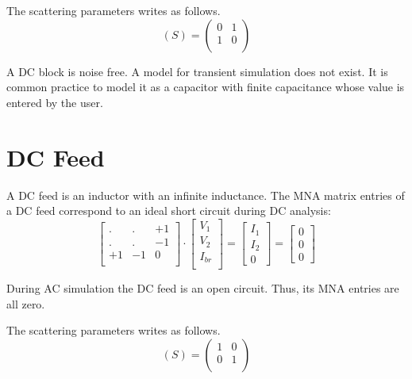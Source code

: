 The scattering parameters writes as follows.
\begin{equation}
(S) =
\begin{pmatrix}
0 & 1\\
1 & 0\\
\end{pmatrix}
\end{equation}

A DC block is noise free. A model for transient simulation does not
exist. It is common practice to model it as a capacitor with finite
capacitance whose value is entered by the user.


\section{DC Feed}

A DC feed is an inductor with an infinite inductance. The MNA
matrix entries of a DC feed correspond to an ideal short
circuit during DC analysis:
\begin{equation}
\begin{bmatrix}
. & . & +1\\
. & . & -1\\
+1 & -1 & 0\\
\end{bmatrix}
\cdot
\begin{bmatrix}
V_1\\
V_2\\
I_{br}\\
\end{bmatrix}
=
\begin{bmatrix}
I_1\\
I_2\\
0
\end{bmatrix}
=
\begin{bmatrix}
0\\
0\\
0
\end{bmatrix}
\end{equation}

During AC simulation the DC feed is an open circuit. Thus, its MNA
entries are all zero.

\addvspace{12pt}

The scattering parameters writes as follows.
\begin{equation}
(S) =
\begin{pmatrix}
1 & 0\\
0 & 1\\
\end{pmatrix}
\end{equation}

